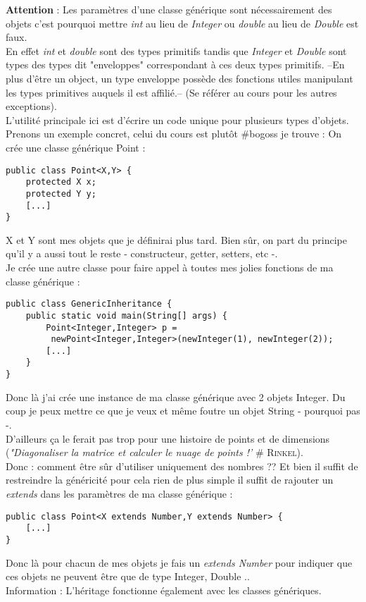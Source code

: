 \documentclass{article}
\begin{document}
\textbf{Attention} : Les paramètres d'une classe générique sont nécessairement des objets c'est pourquoi mettre \emph{int} au lieu de \emph{Integer} ou \emph{double} au lieu de \emph{Double} est faux.\\
En effet \emph{int} et \emph{double} sont des types primitifs tandis que \emph{Integer} et \emph{Double} sont types des types dit "enveloppes" correspondant à ces deux types primitifs. --En plus d'être un object, un type enveloppe possède des fonctions utiles manipulant les types primitives auquels il est affilié.-- (Se référer au cours pour les autres exceptions).\\

\noindent
L'utilité principale ici est d'écrire un code unique pour plusieurs types d'objets. Prenons un exemple concret, celui du cours est plutôt \#bogoss je trouve :
On crée une classe générique Point :
\begin{lstlisting}
public class Point<X,Y> {
	protected X x;
	protected Y y;
	[...]
}
\end{lstlisting}
X et Y sont mes objets que je définirai plus tard. Bien sûr, on part du principe qu'il y a aussi tout le reste - constructeur, getter, setters, etc -.\\
Je crée une autre classe pour faire appel à toutes mes jolies fonctions de ma classe générique :

\begin{lstlisting}
public class GenericInheritance {
	public static void main(String[] args) {
		Point<Integer,Integer> p =
		 newPoint<Integer,Integer>(newInteger(1), newInteger(2));
		[...]
	}
}
\end{lstlisting}
Donc là j'ai crée une instance de ma classe générique avec 2 objets Integer. Du coup je peux mettre ce que je veux et même foutre un objet String - pourquoi pas -.\\
D'ailleurs ça le ferait pas trop pour une histoire de points et de dimensions (\emph{"Diagonaliser la matrice et calculer le nuage de points !'} \# \textsc{Rinkel}).\\
Donc : comment être sûr d'utiliser uniquement des nombres ?? Et bien il suffit de restreindre la généricité pour cela rien de plus simple il suffit de rajouter un \emph{extends} dans les paramètres de ma classe générique :
\begin{lstlisting}
public class Point<X extends Number,Y extends Number> {
	[...]
}
\end{lstlisting}
Donc là pour chacun de mes objets je fais un \emph{extends Number} pour indiquer que ces objets ne peuvent être que de type Integer, Double .. \\
Information : L'héritage fonctionne également avec les classes génériques.
\end{document}
